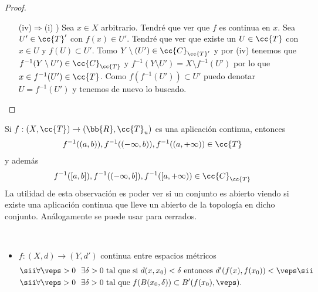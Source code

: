 \begin{prop}
\begin{proof}
\begin{enumerate}
            \item[(iv)$\Rightarrow$(i) )] Sea $x\in X$ arbitrario. Tendré que ver que $f$ es continua en $x$. Sea $U'\in \cc{T}'$ con $f(x)\in U'$. Tendré que ver que existe un $U\in \cc{T}$ con $x\in U$ y $f(U)\subset U'$. Tomo $Y\setminus(U')\in \cc{C}_{\cc{T}'}$ y por (iv) tenemos que $f^{-1}(Y\setminus U')\in \cc{C}_{\cc{T}}$ y $f^{-1}(Y\setminus U') = X \setminus f^{-1}(U')$ por lo que $x\in f^{-1}(U')\in \cc{T}$. Como $f(f^{-1}(U'))\subset U'$ puedo denotar $U = f^{-1}(U')$ y tenemos de nuevo lo buscado. 
        \end{enumerate}
    \end{proof}
\end{prop}

\begin{observacion}
    Si $f: (X, \cc{T}) \to (\bb{R}, \cc{T}_u)$ es una aplicación continua, entonces 
    \begin{gather*}
        f^{-1}((a,b)), f^{-1}((-\infty, b)), f^{-1}((a, +\infty))\in \cc{T}
    \end{gather*}
    y además 
    \begin{gather*}
        f^{-1}([a,b]), f^{-1}((-\infty, b]), f^{-1}([a, +\infty))\in \cc{C}_{\cc{T}}
    \end{gather*}
    La utilidad de esta observación es poder ver si un conjunto es abierto viendo si existe una aplicación continua que lleve un abierto de la topología en dicho conjunto. Análogamente se puede usar para cerrados.
    \endsquare
\end{observacion}

\begin{ejemplo}\
    \begin{itemize}
        \item $f:(X, d) \to (Y, d')$ continua entre espacios métricos 
        \begin{align*}
            \sii &\forall \veps >0\ \ \exists \delta >0 \text{ tal que si } d(x, x_0)<\delta \text{ entonces } d'(f(x), f(x_0))<\veps \sii\\
            \sii &\forall \veps >0 \ \ \exists \delta >0 \text{ tal que } f(B(x_0, \delta))\subset B'(f(x_0), \veps).
        \end{align*}
    \end{itemize}
    \endsquare
\end{ejemplo}

